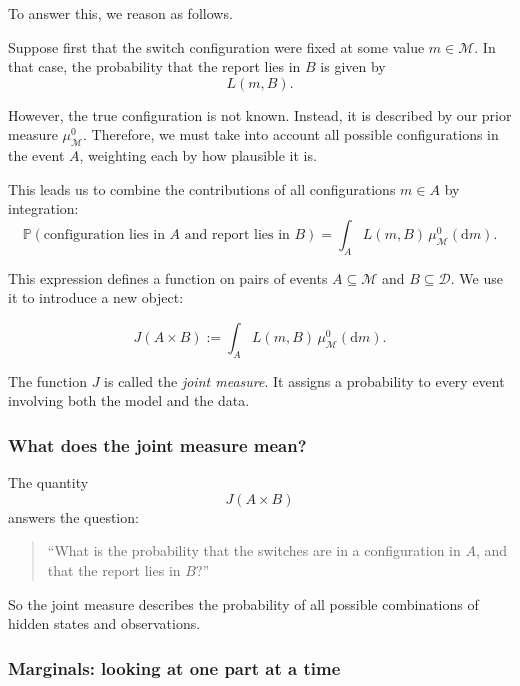 \documentclass[11pt]{article}
\theoremstyle{remark}
\newcommand{\modelspace}{\mathcal{M}}
\newcommand{\dataspace}{\mathcal{D}}
\begin{document}
To answer this, we reason as follows.

\vspace{2mm}

Suppose first that the switch configuration were fixed at some value \(m \in \modelspace\). In that case, the probability that the report lies in \(B\) is given by
\[
L(m,B).
\]

However, the true configuration is not known. Instead, it is described by our prior measure \(\mu_{\modelspace}^0\). Therefore, we must take into account all possible configurations in the event \(A\), weighting each by how plausible it is.

\vspace{2mm}

This leads us to combine the contributions of all configurations \(m \in A\) by integration:
\[
\mathbb P(\text{configuration lies in } A \text{ and report lies in } B)
=
\int_A L(m,B)\,\mu_{\modelspace}^0(\mathrm dm).
\]

\vspace{2mm}

This expression defines a function on pairs of events \(A \subseteq \modelspace\) and \(B \subseteq \dataspace\). We use it to introduce a new object:

\[
J(A \times B)
:=
\int_A L(m,B)\,\mu_{\modelspace}^0(\mathrm dm).
\]

\vspace{2mm}

The function \(J\) is called the \emph{joint measure}. It assigns a probability to every event involving both the model and the data.

\subsubsection{What does the joint measure mean?}

The quantity
\[
J(A \times B)
\]
answers the question:

\begin{quote}
``What is the probability that the switches are in a configuration in \(A\), and that the report lies in \(B\)?''
\end{quote}

So the joint measure describes the probability of all possible combinations of hidden states and observations.

\vspace{2mm}

\subsubsection{Marginals: looking at one part at a time}
\end{document}
